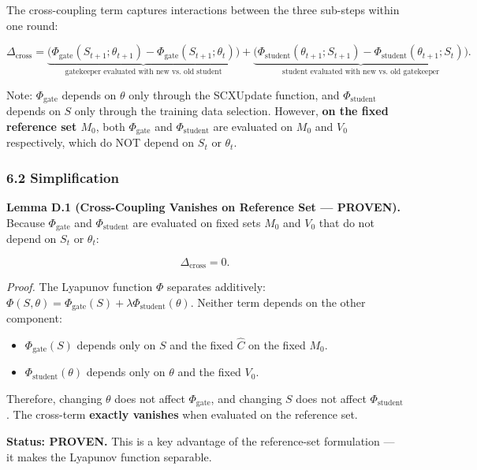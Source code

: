 \documentclass[
  12pt,
]{ctexart}
\providecommand{\tightlist}{%
  \setlength{\itemsep}{0pt}\setlength{\parskip}{0pt}}
\begin{document}
The cross-coupling term captures interactions between the three
sub-steps within one round:

\[\Delta_{\text{cross}} = \underbrace{\bigl(\Phi_{\text{gate}}(S_{t+1}; \theta_{t+1}) - \Phi_{\text{gate}}(S_{t+1}; \theta_t)\bigr)}_{\text{gatekeeper evaluated with new vs. old student}} + \underbrace{\bigl(\Phi_{\text{student}}(\theta_{t+1}; S_{t+1}) - \Phi_{\text{student}}(\theta_{t+1}; S_t)\bigr)}_{\text{student evaluated with new vs. old gatekeeper}}.\]

Note: \(\Phi_{\text{gate}}\) depends on \(\theta\) only through the
SCXUpdate function, and \(\Phi_{\text{student}}\) depends on \(S\) only
through the training data selection. However, \textbf{on the fixed
reference set \(M_0\)}, both \(\Phi_{\text{gate}}\) and
\(\Phi_{\text{student}}\) are evaluated on \(M_0\) and \(V_0\)
respectively, which do NOT depend on \(S_t\) or \(\theta_t\).

\subsubsection{6.2 Simplification}\label{simplification}

\textbf{Lemma D.1 (Cross-Coupling Vanishes on Reference Set ---
PROVEN).} Because \(\Phi_{\text{gate}}\) and \(\Phi_{\text{student}}\)
are evaluated on fixed sets \(M_0\) and \(V_0\) that do not depend on
\(S_t\) or \(\theta_t\):

\[\Delta_{\text{cross}} = 0.\]

\emph{Proof.} The Lyapunov function \(\Phi\) separates additively:
\(\Phi(S, \theta) = \Phi_{\text{gate}}(S) + \lambda \Phi_{\text{student}}(\theta)\).
Neither term depends on the other component:

\begin{itemize}
\tightlist
\item
  \(\Phi_{\text{gate}}(S)\) depends only on \(S\) and the fixed
  \(\hat{C}\) on the fixed \(M_0\).
\item
  \(\Phi_{\text{student}}(\theta)\) depends only on \(\theta\) and the
  fixed \(V_0\).
\end{itemize}

Therefore, changing \(\theta\) does not affect \(\Phi_{\text{gate}}\),
and changing \(S\) does not affect \(\Phi_{\text{student}}\). The
cross-term \textbf{exactly vanishes} when evaluated on the reference
set.

\textbf{Status: PROVEN.} This is a key advantage of the reference-set
formulation --- it makes the Lyapunov function separable.
\end{document}
